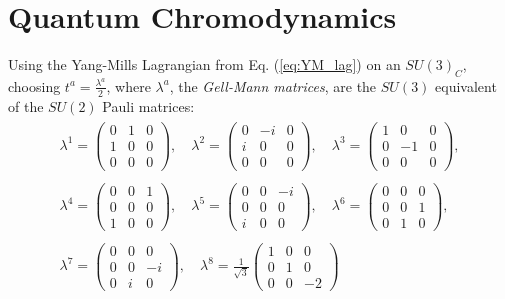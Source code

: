 \documentclass[12pt, a4paper]{book}
\begin{document}
\section{Quantum Chromodynamics}
Using the Yang-Mills Lagrangian from Eq. (\ref{eq:YM_lag}) on an $SU(3)_C$, choosing $t^a =\frac{\lambda^a}{2}$, where $\lambda^a$, the \textit{Gell-Mann matrices}, are the $SU(3)$ equivalent of the $SU(2)$ Pauli matrices:
\begin{align}\label{eq:Gell-Mann}
    \begin{split}
        \lambda ^{1}={\begin{pmatrix}0&1&0\\1&0&0\\0&0&0\end{pmatrix}},\quad 
        \lambda ^{2}={\begin{pmatrix}0&-i&0\\i&0&0\\0&0&0\end{pmatrix}},\quad 
        \lambda ^{3}={\begin{pmatrix}1&0&0\\0&-1&0\\0&0&0\end{pmatrix}}, \\\\
        \lambda ^{4}={\begin{pmatrix}0&0&1\\0&0&0\\1&0&0\end{pmatrix}},\quad 
        \lambda ^{5}={\begin{pmatrix}0&0&-i\\0&0&0\\i&0&0\end{pmatrix}},\quad 
        \lambda ^{6}={\begin{pmatrix}0&0&0\\0&0&1\\0&1&0\end{pmatrix}}, \\\\
        \lambda ^{7}={\begin{pmatrix}0&0&0\\0&0&-i\\0&i&0\end{pmatrix}},\quad 
        \lambda ^{8}={\frac {1}{\sqrt {3}}}{\begin{pmatrix}1&0&0\\0&1&0\\0&0&-2\end{pmatrix}}
    \end{split}
\end{align} 
\end{document}
